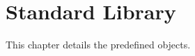
\chapter{\us Standard Library}
\label{sec:stdlib}

This chapter details the predefined objects.

\let\sectionOrig\section
\renewcommand{\section}[1]{\clearpage\sectionObject{#1}}

